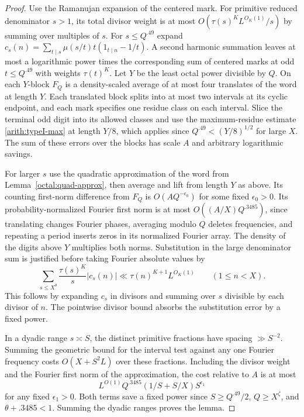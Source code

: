 \documentclass[11pt,a4paper]{article}
\theoremstyle{paperplain}
\numberwithin{equation}{section}
\begin{document}
\begin{proof}
Use the Ramanujan expansion of the centered mark. For primitive
reduced denominator $s>1$, its total divisor weight is at most
$O(\tau(s)^K L^{O_K(1)}/s)$ by summing over multiples of $s$.
For $s\le Q^{.49}$ expand
$c_s(n)=\sum_{t\mid s}\mu(s/t)t(1_{t\mid n}-1/t)$.
A second harmonic summation leaves at most a logarithmic power
times the corresponding sum of centered marks at odd $t\le Q^{.49}$
with weights $\tau(t)^K$.
Let $Y$ be the least octal power divisible by $Q$. On each
$Y$-block $F_Q$ is a density-scaled average of at most four
translates of the word at length $Y$. Each translated block
splits into at most two intervals at its cyclic endpoint, and
each mark specifies one residue class on each interval.
Slice the terminal odd digit into its allowed classes and use
the maximum-residue estimate \eqref{arith:typeI-max} at
length $Y/8$, which applies since $Q^{.49}<(Y/8)^{1/2}$ for
large $X$. The sum of these errors over the blocks has scale $A$
and arbitrary logarithmic savings.

For larger $s$ use the quadratic approximation of the word
from Lemma~\ref{octal:quad-approx}, then average and lift
from length $Y$ as above. Its counting first-norm difference
from $F_Q$ is $O(AQ^{-\epsilon_0})$ for some fixed $\epsilon_0>0$.
Its probability-normalized Fourier first norm is at most
$O((A/X)Q^{.3485})$, since translating changes Fourier phases, averaging modulo $Q$ deletes
frequencies, and repeating a period inserts zeros in its normalized
Fourier array. The density of the digits above $Y$ multiplies both norms. Substitution in the large denominator
sum is justified before taking Fourier absolute values by
\[
 \sum_{s\le X^\theta}\frac{\tau(s)^K}{s}|c_s(n)|
    \ll \tau(n)^{K+1}L^{O_K(1)}\qquad (1\le n<X).
\]
This follows by expanding $c_s$ in divisors and summing over
$s$ divisible by each divisor of $n$. The pointwise divisor
bound absorbs the substitution error by a fixed power.

In a dyadic range $s\asymp S$, the distinct primitive fractions
have spacing $\gg S^{-2}$. Summing the geometric bound for the
interval test against any one Fourier frequency costs
$O(X+S^2 L)$ over these fractions. Including the divisor weight
and the Fourier first norm of the approximation, the cost
relative to $A$ is at most
\[
 L^{O(1)} Q^{.3485} (1/S+S/X) S^{\epsilon_1}
\]
for any fixed $\epsilon_1>0$. Both terms save a fixed power
since $S\ge Q^{.49}/2$, $Q\ge X^\zeta$, and
$\theta+.3485<1$. Summing the dyadic ranges proves the lemma.
\end{proof}
\end{document}
